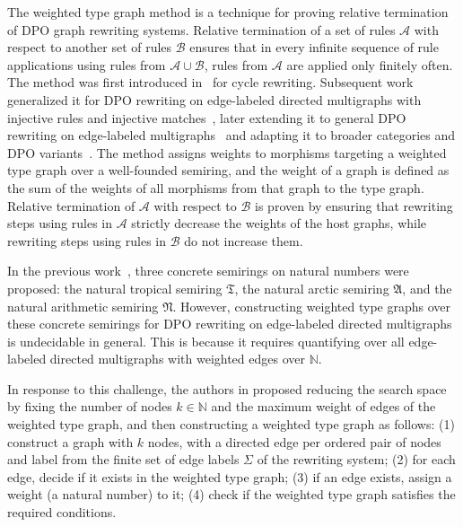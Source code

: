 The weighted type graph method is a technique for proving relative termination~\cite{geser1990relative} of DPO graph rewriting systems. 
Relative termination of a set of rules $\mathcal{A}$ with respect to another set of rules $\mathcal{B}$ ensures that in every infinite sequence of rule applications using rules from  $\mathcal{A} \cup \mathcal{B}$, rules from $\mathcal{A}$ are applied only finitely often. The method was first introduced in~\cite{zantema2014termination} for cycle rewriting. Subsequent work generalized it for DPO rewriting on edge-labeled directed multigraphs with injective rules and injective matches~\cite{bruggink2014termination}, later extending it to general DPO rewriting on edge-labeled multigraphs~\cite{bruggink2015proving} and adapting it to broader categories and DPO variants~\cite{endrullis2024generalized_arxiv_v2}.
The method assigns weights to morphisms targeting a weighted type graph over a well-founded semiring, and the weight of a graph is defined
 as the sum of the weights of all morphisms from that graph to the type graph. Relative termination of $\mathcal{A}$ with respect to $\mathcal{B}$ is proven by ensuring that rewriting steps using rules in \( \mathcal{A} \) strictly decrease the weights of the host graphs, while rewriting steps using rules in \( \mathcal{B} \) do not increase them.
   
    In the previous work~\cite{zantema2014termination,bruggink2014termination,bruggink2015proving}, three concrete semirings on natural numbers were proposed: the natural tropical semiring $\mathfrak{T}$, the natural arctic semiring $\mathfrak{A}$, and the natural arithmetic semiring $\mathfrak{N}$.
    However, constructing weighted type graphs over these concrete semirings for DPO rewriting on edge-labeled directed multigraphs is undecidable in general. This is because it requires quantifying over all edge-labeled directed multigraphs with weighted edges over $\mathbb{N}$. 

    In response to this challenge, the authors in \cite{zantema2014termination,bruggink2014termination,bruggink2015proving} proposed reducing the search space by fixing the number of nodes \( k \in \mathbb{N} \) and the maximum weight of edges of the weighted type graph, and then constructing a weighted type graph as follows: (1) construct a graph with \( k \) nodes, with a directed edge per ordered pair of nodes and label from the finite set of edge labels $\Sigma$ of the rewriting system; (2) for each edge, decide if it exists in the weighted type graph; (3) if an edge exists, assign a weight (a natural number) to it; (4) check if the weighted type graph satisfies the required conditions.
    
